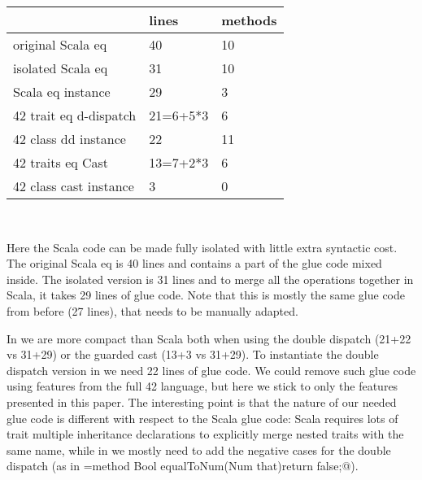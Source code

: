 \noindent
\begin{minipage}{0.46\textwidth}
\begin{tabular}{l |l |l}
&                              lines  &   methods\\
\hline
original Scala eq           &    40   &   10\\
isolated Scala eq           &   31    &   10\\
Scala eq instance           &    29   &    3\\
42 trait eq d-dispatch      &   21=6+5*3   &    6\\
42 class dd instance        &    22   &   11\\
42 traits eq Cast            &   13=7+2*3   &    6\\
42 class cast instance      &     3   &    0\\
\end{tabular}
\end{minipage}\quad\ \ 
\begin{minipage}{0.5\textwidth}
Here the Scala code can be made fully isolated with little
extra syntactic cost. The original Scala eq is 40 lines and
contains a part of the glue code mixed inside.
The isolated version is 31 lines and to merge all the operations together in Scala, it
takes 29 lines of glue code. Note that this
is mostly the same glue code from before (27 lines), that
needs to be manually adapted.
\end{minipage}

In \name we are
more compact than Scala both when using the double dispatch (21+22 vs 31+29)
or the guarded cast (13+3 vs 31+29).
To instantiate the double dispatch 
version in \name we need 22 lines of glue code.
We could remove such glue code using 
features from the full 42 language, but here we stick to only the features presented in this paper.
The interesting point is that the nature of our needed glue code 
is different with respect to the Scala glue code:
Scala requires lots of trait multiple inheritance declarations to explicitly merge
nested traits with the same name, while in \name we mostly need 
to add the negative cases for the double dispatch (as in
\Q@Sum={method Bool equalToNum(Num that){return false;}}@).


